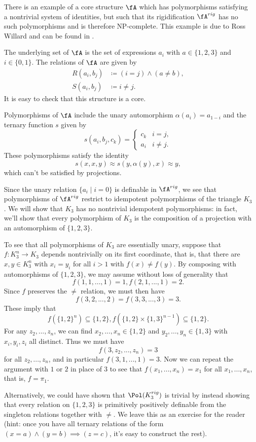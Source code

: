 \begin{ex} There is an example of a core structure $\fA$ which has polymorphisms satisfying a nontrivial system of identities, but such that its rigidification $\fA^{rig}$ has no such polymorphisms and is therefore NP-complete. This example is due to Ross Willard and can be found in \cite{topology-irrelevant}.

The underlying set of $\fA$ is the set of expressions $a_i$ with $a \in \{1,2,3\}$ and $i \in \{0,1\}$. The relations of $\fA$ are given by
\begin{align*}
R(a_i,b_j) &\coloneqq (i = j) \wedge (a \ne b),\\
S(a_i,b_j) &\coloneqq i \ne j.
\end{align*}
It is easy to check that this structure is a core.

Polymorphisms of $\fA$ include the unary automorphism $\alpha(a_i) = a_{1-i}$ and the ternary function $s$ given by
\[
s(a_i,b_j,c_k) = \begin{cases}c_k & i = j,\\ a_i & i \ne j.\end{cases}
\]
These polymorphisms satisfy the identity
\[
s(x,x,y) \approx s(y,\alpha(y),x) \approx y,
\]
which can't be satisfied by projections.

Since the unary relation $\{a_i \mid i = 0\}$ is definable in $\fA^{rig}$, we see that polymorphisms of $\fA^{rig}$ restrict to idempotent polymorphisms of the triangle $K_3$. We will show that $K_3$ has no nontrivial idempotent polymorphisms: in fact, we'll show that every polymorphism of $K_3$ is the composition of a projection with an automorphism of $\{1,2,3\}$.

To see that all polymorphisms of $K_3$ are essentially unary, suppose that $f : K_3^n \rightarrow K_3$ depends nontrivially on its first coordinate, that is, that there are $x,y \in K_3^n$ with $x_i = y_i$ for all $i > 1$ with $f(x) \ne f(y)$. By composing with automorphisms of $\{1,2,3\}$, we may assume without loss of generality that
\[
f(1,1,...,1) = 1, f(2,1,...,1) = 2.
\]
Since $f$ preserves the $\ne$ relation, we must then have
\[
f(3,2,...,2) = f(3,3,...,3) = 3.
\]
These imply that
\[
f(\{1,2\}^n) \subseteq \{1,2\}, f(\{1,2\}\times \{1,3\}^{n-1}) \subseteq \{1,2\}.
\]
For any $z_2, ..., z_n$, we can find $x_2, ..., x_n \in \{1,2\}$ and $y_2, ..., y_n \in \{1,3\}$ with $x_i,y_i,z_i$ all distinct. Thus we must have
\[
f(3,z_2, ..., z_n) = 3
\]
for all $z_2, ..., z_n$, and in particular $f(3,1,...,1) = 3$. Now we can repeat the argument with $1$ or $2$ in place of $3$ to see that $f(x_1, ..., x_n) = x_1$ for all $x_1, ..., x_n$, that is, $f = \pi_1$.

Alternatively, we could have shown that $\Pol(K_3^{rig})$ is trivial by instead showing that every relation on $\{1,2,3\}$ is primitively positively definable from the singleton relations together with $\ne$. We leave this as an exercise for the reader (hint: once you have all ternary relations of the form $(x=a)\wedge(y=b) \implies (z=c)$, it's easy to construct the rest).
\end{ex}

